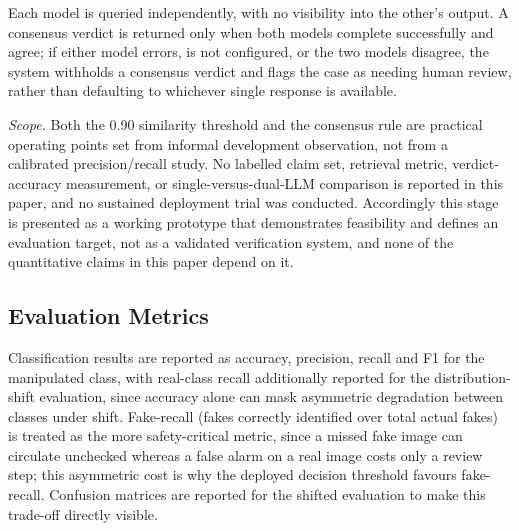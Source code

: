 \documentclass[conference,a4paper]{IEEEtran}
\begin{document}
Each model is queried independently, with no visibility into the other's
output. A consensus verdict is returned only when both models complete
successfully and agree; if either model errors, is not configured, or the two
models disagree, the system withholds a consensus verdict and flags the case
as needing human review, rather than defaulting to whichever single response
is available.

\emph{Scope.} Both the 0.90 similarity threshold and the consensus rule are
practical operating points set from informal development observation, not from
a calibrated precision/recall study. No labelled claim set, retrieval metric,
verdict-accuracy measurement, or single-versus-dual-LLM comparison is
reported in this paper, and no sustained deployment trial was conducted.
Accordingly this stage is presented as a working prototype that demonstrates
feasibility and defines an evaluation target, not as a validated verification
system, and none of the quantitative claims in this paper depend on it.

\subsection{Evaluation Metrics}

Classification results are reported as accuracy, precision, recall and F1 for
the manipulated class, with real-class recall additionally reported for the
distribution-shift evaluation, since accuracy alone can mask asymmetric
degradation between classes under shift. Fake-recall (fakes correctly
identified over total actual fakes) is treated as the more safety-critical
metric, since a missed fake image can circulate unchecked whereas a false
alarm on a real image costs only a review step; this asymmetric cost is why
the deployed decision threshold favours fake-recall. Confusion matrices are
reported for the shifted evaluation to make this trade-off directly visible.
\end{document}
